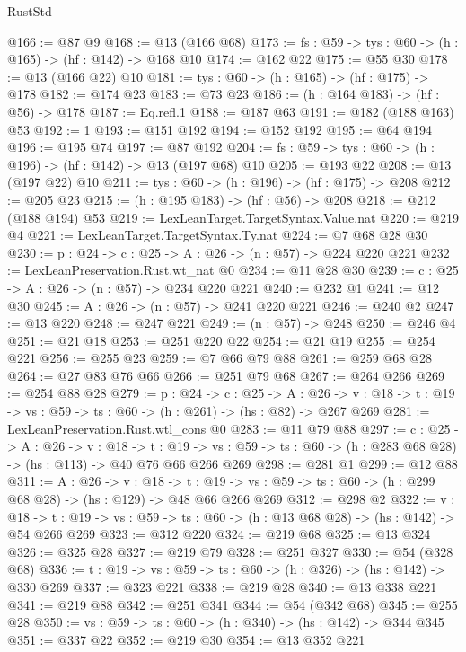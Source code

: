\begin{lexlean}{RustStd}
\begin{coremodule}
@166 := @87 @9
@168 := @13 (@166 @68)
@173 := {fs : @59} -> {tys : @60} -> (h : @165) -> (hf : @142) -> @168 @10
@174 := @162 @22
@175 := @55 @30
@178 := @13 (@166 @22) @10
@181 := {tys : @60} -> (h : @165) -> (hf : @175) -> @178
@182 := @174 @23
@183 := @73 @23
@186 := (h : @164 @183) -> (hf : @56) -> @178
@187 := Eq.refl.{1}
@188 := @187 @63
@191 := @182 (@188 @163) @53
@192 := 1
@193 := @151 @192
@194 := @152 @192
@195 := @64 @194
@196 := @195 @74
@197 := @87 @192
@204 := {fs : @59} -> {tys : @60} -> (h : @196) -> (hf : @142) -> @13 (@197 @68) @10
@205 := @193 @22
@208 := @13 (@197 @22) @10
@211 := {tys : @60} -> (h : @196) -> (hf : @175) -> @208
@212 := @205 @23
@215 := (h : @195 @183) -> (hf : @56) -> @208
@218 := @212 (@188 @194) @53
@219 := LexLeanTarget.TargetSyntax.Value.nat
@220 := @219 @4
@221 := LexLeanTarget.TargetSyntax.Ty.nat
@224 := @7 @68 @28 @30
@230 := {p : @24} -> {c : @25} -> {A : @26} -> (n : @57) -> @224 @220 @221
@232 := LexLeanPreservation.Rust.wt_nat @0
@234 := @11 @28 @30
@239 := {c : @25} -> {A : @26} -> (n : @57) -> @234 @220 @221
@240 := @232 @1
@241 := @12 @30
@245 := {A : @26} -> (n : @57) -> @241 @220 @221
@246 := @240 @2
@247 := @13 @220
@248 := @247 @221
@249 := (n : @57) -> @248
@250 := @246 @4
@251 := @21 @18
@253 := @251 @220 @22
@254 := @21 @19
@255 := @254 @221
@256 := @255 @23
@259 := @7 @66 @79 @88
@261 := @259 @68 @28
@264 := @27 @83 @76 @66
@266 := @251 @79 @68
@267 := @264 @266
@269 := @254 @88 @28
@279 := {p : @24} ->
  {c : @25} ->
  {A : @26} ->
  {v : @18} -> {t : @19} -> {vs : @59} -> {ts : @60} -> (h : @261) -> (hs : @82) -> @267 @269
@281 := LexLeanPreservation.Rust.wtl_cons @0
@283 := @11 @79 @88
@297 := {c : @25} ->
  {A : @26} ->
  {v : @18} ->
  {t : @19} ->
  {vs : @59} -> {ts : @60} -> (h : @283 @68 @28) -> (hs : @113) -> @40 @76 @66 @266 @269
@298 := @281 @1
@299 := @12 @88
@311 := {A : @26} ->
  {v : @18} ->
  {t : @19} -> {vs : @59} -> {ts : @60} -> (h : @299 @68 @28) -> (hs : @129) -> @48 @66 @266 @269
@312 := @298 @2
@322 := {v : @18} ->
  {t : @19} -> {vs : @59} -> {ts : @60} -> (h : @13 @68 @28) -> (hs : @142) -> @54 @266 @269
@323 := @312 @220
@324 := @219 @68
@325 := @13 @324
@326 := @325 @28
@327 := @219 @79
@328 := @251 @327
@330 := @54 (@328 @68)
@336 := {t : @19} -> {vs : @59} -> {ts : @60} -> (h : @326) -> (hs : @142) -> @330 @269
@337 := @323 @221
@338 := @219 @28
@340 := @13 @338 @221
@341 := @219 @88
@342 := @251 @341
@344 := @54 (@342 @68)
@345 := @255 @28
@350 := {vs : @59} -> {ts : @60} -> (h : @340) -> (hs : @142) -> @344 @345
@351 := @337 @22
@352 := @219 @30
@354 := @13 @352 @221

\end{coremodule}
\end{lexlean}
